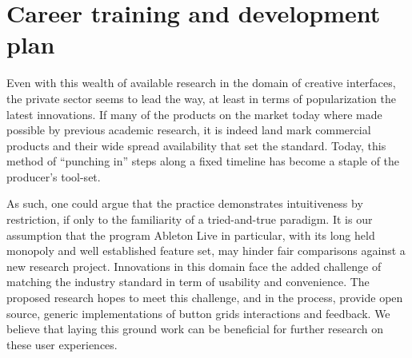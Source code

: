 \documentclass[journal,onecolumn]{IEEEtran}
\begin{document}
\section{Career training and development plan} %
Even with this wealth of available research in the domain of creative interfaces, the private sector seems to lead the way, at least in terms of popularization the latest innovations. If many of the products on the market today where made possible by previous academic research, it is indeed land mark commercial products and their wide spread availability that set the standard. Today, this method of ``punching in'' steps along a fixed timeline has become a staple of the producer's tool-set.

As such, one could argue that the practice demonstrates intuitiveness by restriction, if only to the familiarity of a tried-and-true paradigm. It is our assumption that the program Ableton Live in particular, with its long held monopoly and well established feature set, may hinder fair comparisons against a new research project. Innovations in this domain face the added challenge of matching the industry standard in term of usability and convenience. The proposed research hopes to meet this challenge, and in the process, provide open source, generic implementations of button grids interactions and feedback. We believe that laying this ground work can be beneficial for further research on these user experiences. 

%
%
\end{document}
